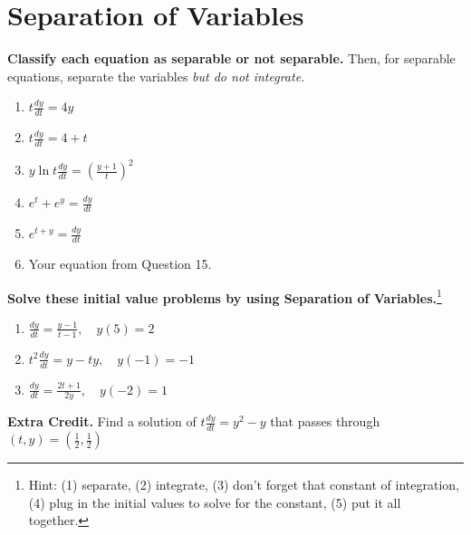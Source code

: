 \documentclass[11pt,onecolumn,superscriptaddress,notitlepage]{article}
\newcommand{\dy}[0]{\displaystyle\frac{dy}{dt}}
\begin{document}
\clearpage
\section*{Separation of Variables}

{\bf Classify each equation as separable or not separable.}  Then, for separable equations, separate the variables {\it but do not integrate.}
\begin{enumerate}[resume]
	\item $t \dy = 4y$
	\item $t \dy = 4+t$
	\item $y \ln t \dy = \left(\frac{y+1}{t}\right)^2$
	\item $e^t + e^y = \dy$
	\item $e^{t+y} = \dy$
	\item Your equation from Question 15.
\end{enumerate}

{\bf Solve these initial value problems by using Separation of Variables.}\footnote{Hint: (1) separate, (2) integrate, (3) don't forget that constant of integration, (4) plug in the initial values to solve for the constant, (5) put it all together.}
\begin{enumerate}[resume]
	\item $\dy = \frac{y-1}{t-1}, \quad y(5)=2$
	\item $t^2 \dy = y-ty,\quad y(-1) = -1$
	\item $\dy = \frac{2t + 1}{2y},\quad y(-2) = 1$
\end{enumerate}

{\bf Extra Credit.} Find a solution of $\displaystyle t \dy = y^2 - y$ that passes through $(t,y) = (\tfrac{1}{2},\tfrac{1}{2})$

\end{document}
